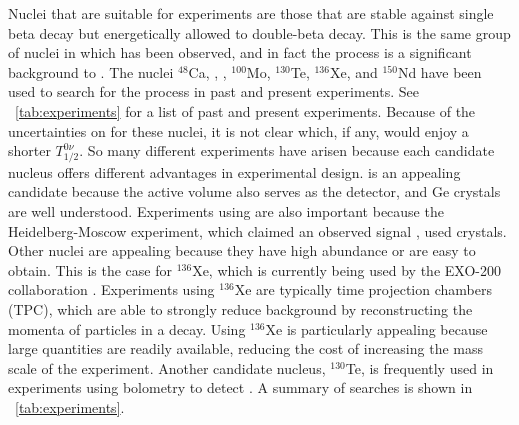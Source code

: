 Nuclei that are suitable for \zvbb experiments are those that are stable against single beta decay but energetically allowed to double-beta decay.  This is the same group of nuclei in which \tvbb has been observed, and in fact the \tvbb process is a significant background to \zvbb.  The nuclei $^{48}$Ca, , , $^{100}$Mo, $^{130}$Te, $^{136}$Xe, and $^{150}$Nd have been used to search for the process in past and present experiments.  See {\tab}~\ref{tab:experiments} for a list of past and present experiments.  Because of the uncertainties on \NME for these nuclei, it is not clear which, if any, would enjoy a shorter $T^{0\nu}_{1/2}$.  So many different experiments have arisen because each candidate nucleus offers different advantages in experimental design.   is an appealing candidate because the active volume also serves as the detector, and Ge crystals are well understood.  Experiments using  are also important because the Heidelberg-Moscow experiment, which claimed an observed \zvbb signal \cite{KlapdorKleingrothaus}, used  crystals.  Other nuclei are appealing because they have high abundance or are easy to obtain.  This is the case for $^{136}$Xe, which is currently being used by the EXO-200 collaboration \cite{EXO200}.  Experiments using $^{136}$Xe are typically time projection chambers (TPC), which are able to strongly reduce background by reconstructing the momenta of particles in a decay.  Using $^{136}$Xe is particularly appealing because large quantities are readily available, reducing the cost of increasing the mass scale of the experiment.  Another candidate nucleus, $^{130}$Te, is frequently used in experiments using bolometry to detect \zvbb.  A summary of \zvbb searches is shown in {\tab}~\ref{tab:experiments}.
